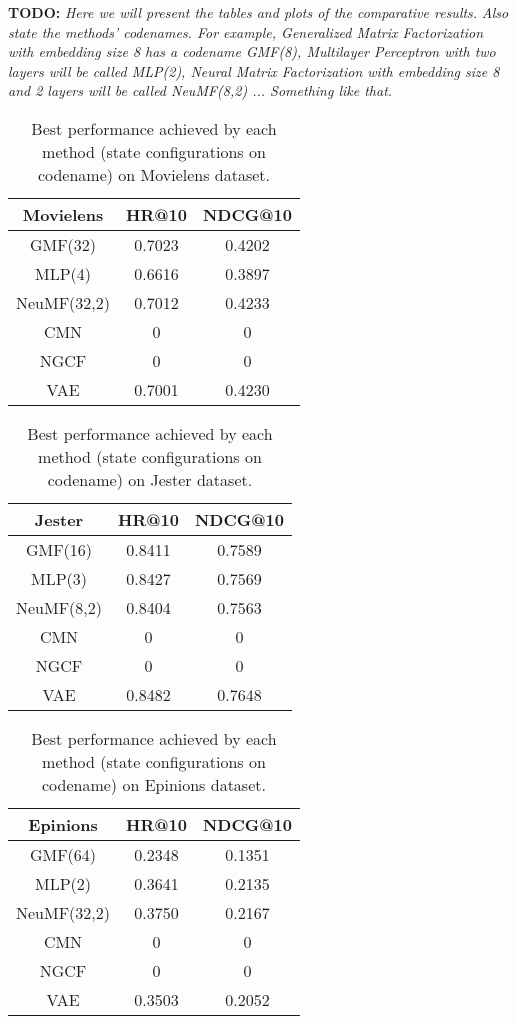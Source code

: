 \textbf{TODO: }
\textit{Here we will present the tables and plots of the comparative results.}
\textit{Also state the methods' codenames. For example, Generalized Matrix Factorization with embedding size 8 has a codename GMF(8), Multilayer Perceptron with two layers will be called MLP(2), Neural Matrix Factorization with embedding size 8 and 2 layers will be called NeuMF(8,2) ... Something like that.}
\begin{table}[h]
    \centering
    \begin{tabular}{c|c|c}
        \hline
        Movielens & HR@10  & NDCG@10 \\
        \hline
        GMF(32)     & 0.7023 & 0.4202  \\
        MLP(4)      & 0.6616 & 0.3897 \\
        NeuMF(32,2) & 0.7012 & 0.4233 \\
        CMN         & 0 & 0 \\
        NGCF        & 0 & 0 \\
        VAE         & 0.7001 & 0.4230
    \end{tabular}
    \caption{Best performance achieved by each method (state configurations on codename) on Movielens dataset.}
    \label{tab:movielens}
\end{table}

\begin{table}[h]
    \centering
    \begin{tabular}{c|c|c}
        \hline
        Jester & HR@10 & NDCG@10 \\
        \hline
        GMF(16)    & 0.8411 & 0.7589 \\
        MLP(3)     & 0.8427 & 0.7569 \\
        NeuMF(8,2) & 0.8404 & 0.7563 \\
        CMN        & 0 & 0 \\
        NGCF       & 0 & 0 \\
        VAE        & 0.8482 & 0.7648
    \end{tabular}
    \caption{Best performance achieved by each method (state configurations on codename) on Jester dataset.}
    \label{tab:jester}
\end{table}

\begin{table}[h]
    \centering
    \begin{tabular}{c|c|c}
        \hline
        Epinions & HR@10 & NDCG@10 \\
        \hline
        GMF(64)     & 0.2348 & 0.1351 \\
        MLP(2)      & 0.3641 & 0.2135 \\
        NeuMF(32,2) & 0.3750 & 0.2167 \\
        CMN         & 0 & 0 \\
        NGCF        & 0 & 0 \\
        VAE         & 0.3503 & 0.2052
    \end{tabular}
    \caption{Best performance achieved by each method (state configurations on codename) on Epinions dataset.}
    \label{tab:epinions}
\end{table}



